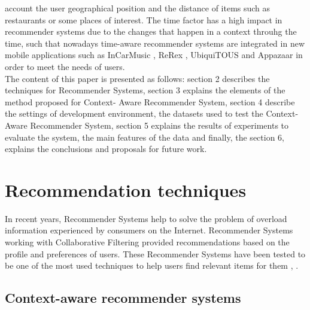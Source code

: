 account the user geographical position and the distance of items such as
restaurants or some places of interest. The time factor has a high impact in
recommender systems due to the changes that happen in a context throuhg the
time, such that nowadays time-aware recommender systems \cite{hamed2012t} are
integrated in new mobile applications such as InCarMusic
\cite{baltrunas2011incarmusic},  ReRex \cite{baltrunas2011mobile},  UbiquiTOUS
\cite{bellavista2012survey} and Appazaar \cite{bohmer2010contextualizing} in
order to meet the needs of users. \\
The content of this paper is presented as
follows: section 2 describes the techniques for Recommender Systems, section 3
explains the elements of the method proposed for Context- Aware Recommender
System, section 4 describe the settings of development environment, the datasets
used to test the Context-Aware Recommender System, section 5 explains the
results of experiments to evaluate the system, the main features of the data and
finally, the section 6, explains the conclusions and proposals for future work.

\section{ Recommendation techniques } \label{sec:2} 

In recent years, Recommender Systems help to solve the problem of overload
information experienced by consumers on the Internet. Recommender Systems
working with Collaborative Filtering provided recommendations based on the
profile and preferences of users. These Recommender Systems have been tested to
be one of the most used techniques to help users find relevant items for them
\cite{dey2001understanding}, \cite{burke2007hybrid}.

  \subsection{Context-aware recommender systems} \label{sec:2.1}  


